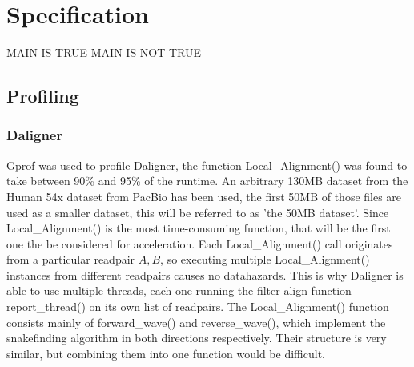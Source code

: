 \documentclass[../main/thesis.tex]{subfiles}
\begin{document}
\chapter{Specification}
\ifdefined\main
\acresetall
MAIN IS TRUE
\newcommand{\codePath}{../4_specification/code/}
\newcommand{\figPath}{../4_specification/figures/}
\else
MAIN IS NOT TRUE

\fi

\section{Profiling}




\subsection{Daligner}
Gprof \cite{gprof} was used to profile Daligner, the function Local\_Alignment() was found to take between 90\% and 95\% of the runtime.
An arbitrary 130MB dataset from the Human 54x dataset from PacBio \cite{54x} has been used, the first 50MB of those files are used as a smaller dataset, this will be referred to as 'the 50MB dataset'.
Since Local\_Alignment() is the most time-consuming function, that will be the first one the be considered for acceleration.
Each Local\_Alignment() call originates from a particular readpair $A, B$, so executing multiple Local\_Alignment() instances from different readpairs causes no datahazards.
This is why Daligner is able to use multiple threads, each one running the filter-align function report\_thread() on its own list of readpairs.
The Local\_Alignment() function consists mainly of forward\_wave() and reverse\_wave(), which implement the snakefinding algorithm in both directions respectively.
Their structure is very similar, but combining them into one function would be difficult.
\end{document}
